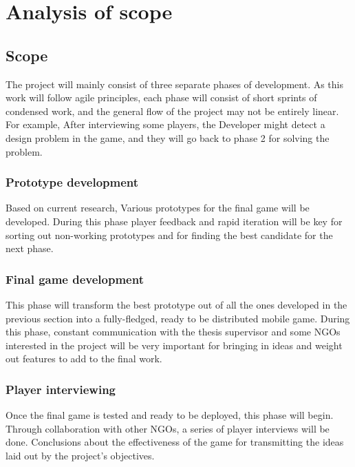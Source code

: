 \chapter{Analysis of scope}

\section{Scope}

The project will mainly consist of three separate phases of development. As this work will follow agile principles, each phase will consist of short sprints of condensed work, and the general flow of the project may not be entirely linear. For example, After interviewing some players, the Developer might detect a design problem in the game, and they will go back to phase 2 for solving the problem.

\subsection{Prototype development}

Based on current research, Various prototypes for the final game will be developed. During this phase player feedback and rapid iteration will be key for sorting out non-working prototypes and for finding the best candidate for the next phase. 

\subsection{Final game development}

This phase will transform the best prototype out of all the ones developed in the previous section into a fully-fledged, ready to be distributed mobile game. During this phase, constant communication with the thesis supervisor and some \glspl{NGO} interested in the project will be very important for bringing in ideas and weight out features to add to the final work. 

\subsection{Player interviewing}

Once the final game is tested and ready to be deployed, this phase will begin. Through collaboration with other \glspl{NGO}, a series of player interviews will be done. Conclusions about the effectiveness of the game for transmitting the ideas laid out by the project's objectives.


